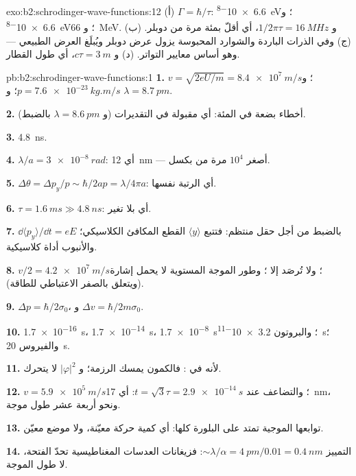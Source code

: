 \begin{solution}{exo:b2:schrodinger-wave-functions:12}
(أ) $\Gamma = \hbar/\tau$: \qty{6.6e-8}{eV}؛ و \qty{6.6e-8}{eV}؛ و \qty{66}{MeV}. (ب)
و $1/2\pi\tau = \qty{16}{MHz}$، أي أقلّ بمئة مرة من دوبلر. (ج) وفي
الذرات الباردة والشوارد المحبوسة يزول عرض دوبلر ويُبلَغ العرض
الطبيعي --- وهو أساس معايير التواتر. (د) و $c\tau =
\qty{3}{m}$، أي طول القطار.
\end{solution}

\begin{solution}{pb:b2:schrodinger-wave-functions:1}
\textbf{1.} $v = \sqrt{2eU/m} = \qty{8.4e7}{m/s}$؛ و $p = \qty{7.6e-23}{kg.m/s}$؛ و $\lambda =
\qty{8.7}{pm}$.

\textbf{2.} أخطاء بضعة في المئة: أي مقبولة في التقديرات (و $\lambda =
\qty{8.6}{pm}$ بالضبط).

\textbf{3.} \qty{4.8}{ns}.

\textbf{4.} $\lambda/a = \qty{3e-8}{rad}$: أي \qty{12}{nm} --- أصغر $10^4$ مرة من
بكسل.

\textbf{5.} $\Delta\theta = \Delta p_y/p \sim \hbar/2ap = \lambda/4\pi a$: أي الرتبة نفسها.

\textbf{6.} $\tau = \qty{1.6}{ms} \gg \qty{4.8}{ns}$: أي بلا تغير.

\textbf{7.} $\dd\langle p_y\rangle/\dd t = eE$ بالضبط من أجل حقل منتظم:
فتتبع $\langle y\rangle$ القطع المكافئ الكلاسيكي؛ والأنبوب أداة
كلاسيكية.

\textbf{8.} $v/2 = \qty{4.2e7}{m/s}$؛ ولا تُرصَد إلا ؛
وطور الموجة المستوية لا يحمل إشارة (ويتعلق بالصفر
الاعتباطي للطاقة).

\textbf{9.} $\Delta p = \hbar/2\sigma_0$، و $\Delta v = \hbar/2m\sigma_0$.

\textbf{10.} \qty{1.7e-16}{s}، \qty{1.7e-14}{s}، \qty{1.7e-8}{s}؛ والبروتون \qty{3.2e-11}{s}؛
والفيروس \qty{20}{s}.

\textbf{11.} لأنه في : فالكمون يمسك
الرزمة؛ و $|\varphi|^2$ لا يتحرك.

\textbf{12.} $v = \qty{5.9e5}{m/s}$؛ والتضاعف عند $t = \sqrt3\tau = \qty{2.9e-14}{s}$:
أي \qty{17}{nm}، ونحو أربعة عشر طول موجة.

\textbf{13.} توابعها الموجية تمتد على البلورة كلها: أي كمية
حركة معيّنة، ولا موضع معيّن.

\textbf{14.} التمييز $\sim\lambda/\alpha = \qty{4}{pm}/0.01 = \qty{0.4}{nm}$: فزيغانات
العدسات المغناطيسية تحدّ الفتحة، لا طول الموجة.


\end{solution}
